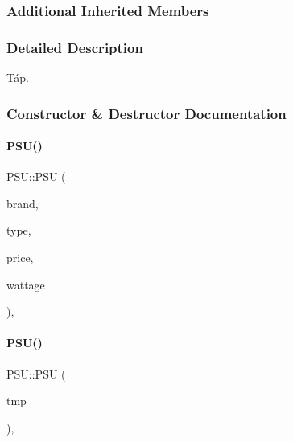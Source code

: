 \subsubsection*{Additional Inherited Members}


\subsubsection{Detailed Description}
Táp. 

\subsubsection{Constructor \& Destructor Documentation}
\mbox{\label{class_p_s_u_a1077b85dde400327880d6f37ebaeef49}} 
\paragraph{\texorpdfstring{PSU()}{PSU()}\hspace{0.1cm}{\footnotesize\ttfamily [1/2]}}
{\footnotesize\ttfamily P\+S\+U\+::\+P\+SU (\begin{DoxyParamCaption}\item[{\mbox{\hyperlink{class_string}{String}}}]{brand,  }\item[{\mbox{\hyperlink{class_string}{String}}}]{type,  }\item[{int}]{price,  }\item[{int}]{wattage }\end{DoxyParamCaption})\hspace{0.3cm}{\ttfamily [inline]}, {\ttfamily [explicit]}}

\mbox{\label{class_p_s_u_a2e8661030cac1d31c85deeb9f7763567}} 
\paragraph{\texorpdfstring{PSU()}{PSU()}\hspace{0.1cm}{\footnotesize\ttfamily [2/2]}}
{\footnotesize\ttfamily P\+S\+U\+::\+P\+SU (\begin{DoxyParamCaption}\item[{\mbox{\hyperlink{struct_temp_input}{Temp\+Input}} \&}]{tmp }\end{DoxyParamCaption})\hspace{0.3cm}{\ttfamily [inline]}, {\ttfamily [explicit]}}



